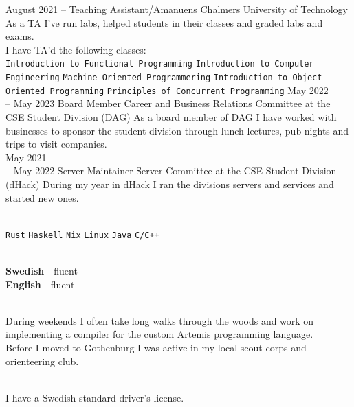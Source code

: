 \documentclass[9pt]{developercv}
\begin{document}
\begin{entrylist}
	\entry
		{August 2021 -- }
		{Teaching Assistant/Amanuens}
		{Chalmers University of Technology}
		{
			As a TA I've run labs, helped students in their classes and
			graded labs and exams.\\ I have TA'd the following classes:\\
			\texttt{Introduction to Functional Programming}\slashsep
			\texttt{Introduction to Computer Engineering}\slashsep
			\texttt{Machine Oriented Programmering}\slashsep
			\texttt{Introduction to Object Oriented Programming}\slashsep
			\texttt{Principles of Concurrent Programming}
		}
	\entry
		{May 2022 \\-- May 2023}
		{Board Member}
		{Career and Business Relations Committee at the CSE Student Division (DAG)}
		{
			As a board member of DAG I have worked with
			businesses to sponsor the student division through
			lunch lectures, pub nights and trips to visit
			companies.\\
		}
	\entry
		{May 2021 \\-- May 2022}
		{Server Maintainer}
		{Server Committee at the CSE Student Division (dHack)}
		{
			During my year in dHack I ran the divisions servers and services and started new ones.\\
		}
\end{entrylist}
\hfill\\
	{
		\texttt{Rust}\slashsep
		\texttt{Haskell}\slashsep
		\texttt{Nix}\slashsep
		\texttt{Linux}\slashsep
		\texttt{Java}\slashsep
		\texttt{C/C++}
	}\\
\begin{minipage}[t]{0.2\textwidth}
	\vspace{-\baselineskip}
	\\
	\textbf{Swedish} - fluent\\
	\textbf{English} - fluent
\end{minipage}
\hfill
\begin{minipage}[t]{0.4\textwidth}
	\vspace{-\baselineskip}
	\\During weekends I often take long walks through the woods and work
	on implementing a compiler for the custom Artemis programming language.
	\\ Before I moved to Gothenburg I was active in my local scout corps and
	orienteering club.
\end{minipage}
\hfill
\begin{minipage}[t]{0.3\textwidth}
	\vspace{-\baselineskip}
	\\I have a Swedish standard driver's license.
\end{minipage}
\end{document}
